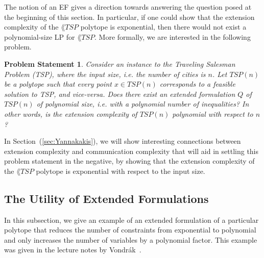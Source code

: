 \documentclass{article}
\newtheorem{probstate}[theorem]{\sc Problem Statement}
\theoremstyle{definition}
\theoremstyle{remark}
\begin{document}
The notion of an EF gives a direction towards answering the question posed at the beginning of this section. In particular, if one could show that the extension complexity of the $\lang{TSP}$ polytope is exponential, then there would not exist a polynomial-size LP for $\lang{TSP}$. More formally, we are interested in the following problem.

\begin{probstate}
Consider an instance to the Traveling Salesman Problem (TSP), where the input size, i.e. the number of cities is $n$. Let $TSP(n)$ be a polytope such that every point $x \in TSP(n)$ corresponds to a feasible solution to TSP, and vice-versa. Does there exist an extended formulation $Q$ of $TSP(n)$ of polynomial size, i.e. with a polynomial number of inequalities? In other words, is the extension complexity of $TSP(n)$ polynomial with respect to $n$?
\end{probstate}

In Section~(\ref{sec:Yannakakis}), we will show interesting connections between extension complexity and communication complexity that will aid in settling this problem statement in the negative, by showing that the extension complexity of the $\lang{TSP}$ polytope is exponential with respect to the input size.

\subsection{The Utility of Extended Formulations}
\label{sec:utility-EF}

In this subsection, we give an example of an extended formulation of a particular polytope that reduces the number of constraints from exponential to polynomial and only increases the number of variables by a polynomial factor. This example was given in the lecture notes by Vondr\'ak~\cite{vondrak-class}.
\end{document}
